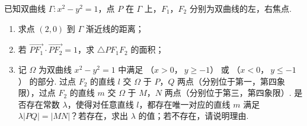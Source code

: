 \documentclass[UTF8,a4paper,oneside,11pt]{ctexbook}
\begin{document}
\begin{problem}
已知双曲线 \( \Gamma:x^2-y^2=1 \)，点 \(P\) 在 \( \Gamma \) 上，\(F_1\)，\(F_2\) 分别为双曲线的左，右焦点.

\begin{enumerate}
\item 求点 \( \left( 2,0 \right) \) 到 \( \Gamma \) 渐近线的距离；
\item 若 \( \overrightarrow{PF_1}\cdot \overrightarrow{PF_2}=1 \)，求 \( \triangle PF_1F_2 \) 的面积；
\item 记 \( \Omega \) 为双曲线 \( x^2-y^2=1 \) 中满足 （\(x>0\)，\(\ y\ge -1\)） 或 （\(x<0\)，\(\ y\le -1\)） 的部分. 过点 \(F_2\) 的直线 \( l \) 交 \( \Omega \) 于 \(P\)，\(Q\) 两点（分别位于第一，第四象限），过点 \(F_2\) 的直线 \( m \) 交 \( \Omega \) 于 \(M\)，\(N\) 两点（分别位于第三，第四象限）. 是否存在常数 \( \lambda \)，使得对任意直线 \( l \)，都存在唯一对应的直线 \( m \) 满足 \( \lambda \left| PQ \right|=\left| MN \right| \)？若存在，求出 \( \lambda \) 的值；若不存在，请说明理由.
\end{enumerate}
\end{problem}
\end{document}
